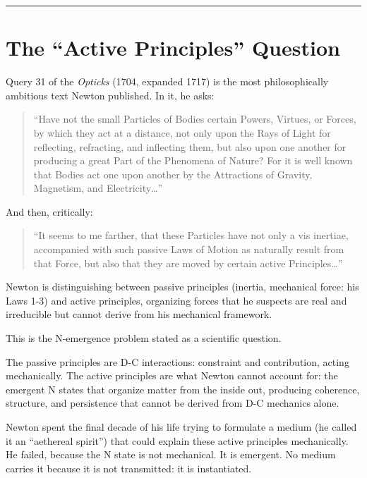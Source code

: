 \documentclass[12pt]{article}
\begin{document}
\begin{center}\rule{0.5\linewidth}{0.5pt}\end{center}

\section{The ``Active Principles'' Question}\label{the-active-principles-question}

Query 31 of the \emph{Opticks} (1704, expanded 1717) is the most
philosophically ambitious text Newton published. In it, he asks:

\begin{quote}
``Have not the small Particles of Bodies certain Powers, Virtues, or
Forces, by which they act at a distance, not only upon the Rays of Light
for reflecting, refracting, and inflecting them, but also upon one
another for producing a great Part of the Phenomena of Nature? For it is
well known that Bodies act one upon another by the Attractions of
Gravity, Magnetism, and Electricity\ldots{}''
\end{quote}

And then, critically:

\begin{quote}
``It seems to me farther, that these Particles have not only a vis
inertiae, accompanied with such passive Laws of Motion as naturally
result from that Force, but also that they are moved by certain active
Principles\ldots{}''
\end{quote}

Newton is distinguishing between passive principles (inertia, mechanical
force: his Laws 1-3) and active principles, organizing forces that he
suspects are real and irreducible but cannot derive from his mechanical
framework.

This is the N-emergence problem stated as a scientific question.

The passive principles are D-C interactions: constraint and
contribution, acting mechanically. The active principles are what Newton
cannot account for: the emergent N states that organize matter from the
inside out, producing coherence, structure, and persistence that cannot
be derived from D-C mechanics alone.

Newton spent the final decade of his life trying to formulate a medium
(he called it an ``aethereal spirit'') that could explain these active
principles mechanically. He failed, because the N state is not
mechanical. It is emergent. No medium carries it because it is not
transmitted: it is instantiated.
\end{document}
